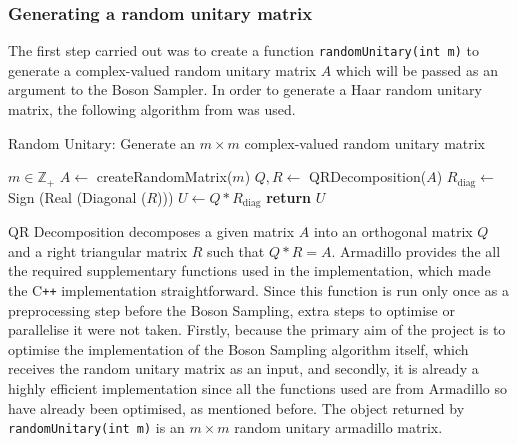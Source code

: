 \documentclass[11pt]{article}
\theoremstyle{theorem}
\theoremstyle{remark}
\theoremstyle{plain}
\theoremstyle{definition}
\begin{document}
\subsubsection{Generating a random unitary matrix}
The first step carried out was to create a function \texttt{randomUnitary(int m)} to generate a complex-valued random unitary matrix $A$ which will be passed as an argument to the Boson Sampler. In order to generate a Haar random unitary matrix, the following algorithm from \cite{ozols2009} was used.
\begin{algorithm}
\caption{Random Unitary: Generate an $m \times m$ complex-valued random unitary matrix}
\begin{algorithmic}[1]
\Require $m \in \mathbb{Z}_+$
\State $A \leftarrow$ createRandomMatrix($m$)
\State $Q, R \leftarrow$ QRDecomposition($A$)
\State $R_{\text{diag}} \leftarrow$ Sign (Real (Diagonal ($R$)))
\State $U \leftarrow Q * R_{\text{diag}}$
\State \textbf{return} $U$
\end{algorithmic}
\end{algorithm}
QR Decomposition decomposes a given matrix $A$ into an orthogonal matrix $Q$ and a right triangular matrix $R$ such that $Q * R = A$. Armadillo provides the all the required supplementary functions used in the implementation, which made the C\texttt{++} implementation straightforward. Since this function is run only once as a preprocessing step before the Boson Sampling, extra steps to optimise or parallelise it were not taken. Firstly, because the primary aim of the project is to optimise the implementation of the Boson Sampling algorithm itself, which receives the random unitary matrix as an input, and secondly, it is already a highly efficient implementation since all the functions used are from Armadillo so have already been optimised, as mentioned before. The object returned by \texttt{randomUnitary(int m)} is an $m \times m$ random unitary armadillo matrix.
\end{document}
